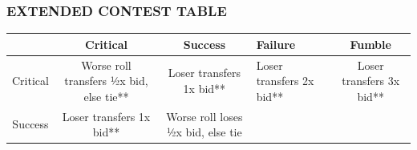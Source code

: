 \documentclass[
]{article}
\begin{document}
\hypertarget{extended-contest-table}{%
\subsubsection{EXTENDED CONTEST TABLE}\label{extended-contest-table}}

\begin{longtable}[]{@{}ccclc@{}}
\toprule
\begin{minipage}[b]{0.18\columnwidth}\centering
\strut
\end{minipage} & \begin{minipage}[b]{0.17\columnwidth}\centering
Critical\strut
\end{minipage} & \begin{minipage}[b]{0.18\columnwidth}\centering
Success\strut
\end{minipage} & \begin{minipage}[b]{0.17\columnwidth}\raggedright
Failure\strut
\end{minipage} & \begin{minipage}[b]{0.18\columnwidth}\centering
Fumble\strut
\end{minipage}\tabularnewline
\midrule
\endhead
\begin{minipage}[t]{0.18\columnwidth}\centering
Critical\strut
\end{minipage} & \begin{minipage}[t]{0.17\columnwidth}\centering
Worse roll transfers ½x bid, else tie**\strut
\end{minipage} & \begin{minipage}[t]{0.18\columnwidth}\centering
Loser transfers 1x bid**\strut
\end{minipage} & \begin{minipage}[t]{0.17\columnwidth}\raggedright
Loser transfers 2x bid**\strut
\end{minipage} & \begin{minipage}[t]{0.18\columnwidth}\centering
Loser transfers 3x bid**\strut
\end{minipage}\tabularnewline
\begin{minipage}[t]{0.18\columnwidth}\centering
Success\strut
\end{minipage} & \begin{minipage}[t]{0.17\columnwidth}\centering
Loser transfers 1x bid**\strut
\end{minipage} & \begin{minipage}[t]{0.18\columnwidth}\centering
Worse roll loses ½x bid, else tie\strut
\end{minipage} & \begin{minipage}[t]{0.17\columnwidth}\raggedright

\end{minipage}
\end{longtable}
\end{document}
